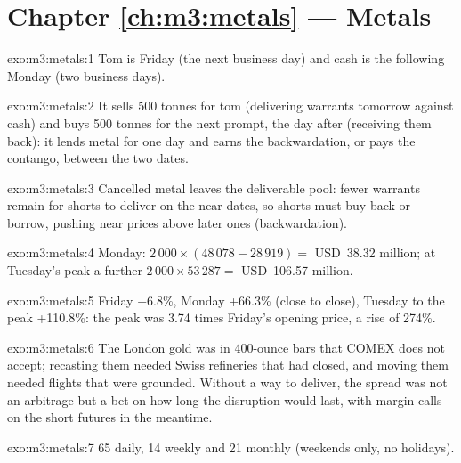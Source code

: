 \section*{Chapter \ref{ch:m3:metals} --- Metals}

\begin{solution}{exo:m3:metals:1}
Tom is Friday (the next business day) and cash is the following Monday (two business days).
\end{solution}

\begin{solution}{exo:m3:metals:2}
It sells 500 tonnes for tom (delivering warrants tomorrow against cash) and buys 500 tonnes for the
next prompt, the day after (receiving them back): it lends metal for one day and earns the
backwardation, or pays the contango, between the two dates.
\end{solution}

\begin{solution}{exo:m3:metals:3}
Cancelled metal leaves the deliverable pool: fewer warrants remain for shorts to deliver on the near
dates, so shorts must buy back or borrow, pushing near prices above later ones (backwardation).
\end{solution}

\begin{solution}{exo:m3:metals:4}
Monday: $2\,000 \times (48\,078 - 28\,919) = $ USD~38.32 million; at Tuesday's peak a further $2\,000
\times 53\,287 = $ USD~106.57 million.
\end{solution}

\begin{solution}{exo:m3:metals:5}
Friday +6.8\%, Monday +66.3\% (close to close), Tuesday to the peak +110.8\%: the peak was 3.74 times
Friday's opening price, a rise of 274\%.
\end{solution}

\begin{solution}{exo:m3:metals:6}
The London gold was in 400-ounce bars that COMEX does not accept; recasting them needed Swiss
refineries that had closed, and moving them needed flights that were grounded. Without a way to
deliver, the spread was not an arbitrage but a bet on how long the disruption would last, with
margin calls on the short futures in the meantime.
\end{solution}

\begin{solution}{exo:m3:metals:7}
65 daily, 14 weekly and 21 monthly  (weekends only, no holidays).
\end{solution}

